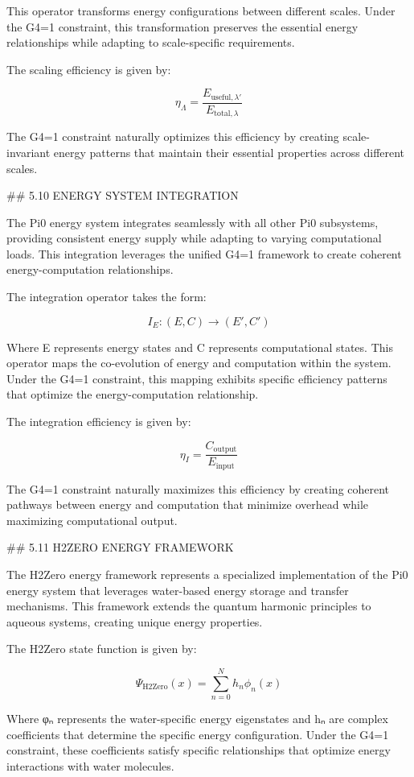 This operator transforms energy configurations between different scales. Under the G4=1 constraint, this transformation preserves the essential energy relationships while adapting to scale-specific requirements.

The scaling efficiency is given by:

$$\eta_{\Lambda} = \frac{E_{\text{useful},\lambda'}}{E_{\text{total},\lambda}}$$

The G4=1 constraint naturally optimizes this efficiency by creating scale-invariant energy patterns that maintain their essential properties across different scales.

## 5.10 ENERGY SYSTEM INTEGRATION

The Pi0 energy system integrates seamlessly with all other Pi0 subsystems, providing consistent energy supply while adapting to varying computational loads. This integration leverages the unified G4=1 framework to create coherent energy-computation relationships.

The integration operator takes the form:

$$I_E: (E, C) \rightarrow (E', C')$$

Where E represents energy states and C represents computational states. This operator maps the co-evolution of energy and computation within the system. Under the G4=1 constraint, this mapping exhibits specific efficiency patterns that optimize the energy-computation relationship.

The integration efficiency is given by:

$$\eta_I = \frac{C_{\text{output}}}{E_{\text{input}}}$$

The G4=1 constraint naturally maximizes this efficiency by creating coherent pathways between energy and computation that minimize overhead while maximizing computational output.

## 5.11 H2ZERO ENERGY FRAMEWORK

The H2Zero energy framework represents a specialized implementation of the Pi0 energy system that leverages water-based energy storage and transfer mechanisms. This framework extends the quantum harmonic principles to aqueous systems, creating unique energy properties.

The H2Zero state function is given by:

$$\Psi_{\text{H2Zero}}(x) = \sum_{n=0}^{N} h_n \phi_n(x)$$

Where φₙ represents the water-specific energy eigenstates and hₙ are complex coefficients that determine the specific energy configuration. Under the G4=1 constraint, these coefficients satisfy specific relationships that optimize energy interactions with water molecules.

